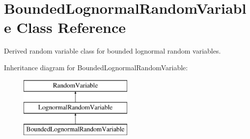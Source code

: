 \section{Bounded\+Lognormal\+Random\+Variable Class Reference}
\label{classPecos_1_1BoundedLognormalRandomVariable}


Derived random variable class for bounded lognormal random variables.  


Inheritance diagram for Bounded\+Lognormal\+Random\+Variable\+:\begin{figure}[H]
\begin{center}
\leavevmode
\includegraphics[height=3.000000cm]{classPecos_1_1BoundedLognormalRandomVariable}
\end{center}
\end{figure}

